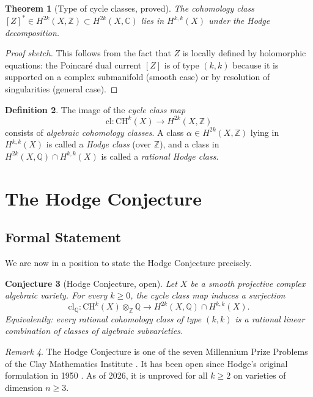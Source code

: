 \documentclass[12pt,a4paper]{amsart}
\newtheorem{theorem}{Theorem}[section]
\newtheorem{conjecture}[theorem]{Conjecture}
\theoremstyle{definition}
\newtheorem{definition}[theorem]{Definition}
\theoremstyle{remark}
\newtheorem{remark}[theorem]{Remark}
\begin{document}
\begin{theorem}[Type of cycle classes, proved]
\label{thm:cycle-type}
The cohomology class $[Z]^* \in H^{2k}(X, \mathbb{Z}) \subset H^{2k}(X, \mathbb{C})$
lies in $H^{k,k}(X)$ under the Hodge decomposition.
\end{theorem}

\begin{proof}[Proof sketch]
This follows from the fact that $Z$ is locally defined by holomorphic equations:
the Poincaré dual current $[Z]$ is of type $(k,k)$ because it is supported on a
complex submanifold (smooth case) or by resolution of singularities (general case).
\end{proof}

\begin{definition}
The image of the \emph{cycle class map}
\[
  \mathrm{cl}: \mathrm{CH}^k(X) \longrightarrow H^{2k}(X, \mathbb{Z})
\]
consists of \emph{algebraic cohomology classes}. A class $\alpha \in H^{2k}(X,\mathbb{Z})$
lying in $H^{k,k}(X)$ is called a \emph{Hodge class} (over $\mathbb{Z}$), and a
class in $H^{2k}(X, \mathbb{Q}) \cap H^{k,k}(X)$ is called a \emph{rational Hodge class}.
\end{definition}

\section{The Hodge Conjecture}
\label{sec:conjecture}

\subsection{Formal Statement}

We are now in a position to state the Hodge Conjecture precisely.

\begin{conjecture}[Hodge Conjecture, open]
\label{conj:hodge}
Let $X$ be a smooth projective complex algebraic variety. For every $k \ge 0$, the
cycle class map induces a surjection
\[
  \mathrm{cl}_\mathbb{Q}: \mathrm{CH}^k(X) \otimes_\mathbb{Z} \mathbb{Q}
  \longrightarrow
  H^{2k}(X, \mathbb{Q}) \cap H^{k,k}(X).
\]
Equivalently: every rational cohomology class of type $(k,k)$ is a rational linear
combination of classes of algebraic subvarieties.
\end{conjecture}

\begin{remark}
\label{rem:millennium}
The Hodge Conjecture is one of the seven Millennium Prize Problems of the Clay
Mathematics Institute \cite{clay2000}. It has been open since Hodge's original
formulation in 1950 \cite{hodge1950}. As of 2026, it is unproved for all $k \ge 2$
on varieties of dimension $n \ge 3$.
\end{remark}
\end{document}
